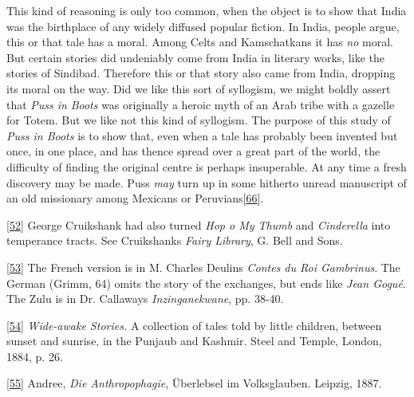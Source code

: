 \documentclass[14pt,a4paper]{memoir}
\begin{document}
This kind of reasoning is only too common, when the object is to show
that India was the birthplace of any widely diffused popular fiction. In
India, people argue, this or that tale has a moral. Among Celts and
Kamschatkans it has \emph{no} moral. But certain stories did undeniably
come from India in literary works, like the stories of Sindibad.
Therefore this or that story also came from India, dropping its moral on
the way. Did we like this sort of syllogism, we might boldly assert that
\emph{Puss in} \emph{Boots} was originally a heroic myth of an Arab
tribe with a gazelle for Totem. But we like not this kind of syllogism.
The purpose of this study of \emph{Puss in Boots} is to show that, even
when a tale has probably been invented but once, in one place, and has
thence spread over a great part of the world, the difficulty of finding
the original centre is perhaps insuperable. At any time a fresh
discovery may be made. Puss \emph{may} turn up in some hitherto unread
manuscript of an old missionary among Mexicans or
Peruvians\protect\hypertarget{4533318093929944247_33931-h-1.htm.xhtmlux5cux23FNanchor_66}{}{}\protect\hyperlink{4533318093929944247_33931-h-1.htm.xhtmlux5cux23Footnote_66}{{[}66{]}}.

\protect\hypertarget{4533318093929944247_33931-h-1.htm.xhtmlux5cux23Footnote_52}{}{}\protect\hyperlink{4533318093929944247_33931-h-0.htm.xhtmlux5cux23FNanchor_52}{{{[}52{]}}}
George Cruikshank had also turned \emph{Hop o\textquotesingle{} My
Thumb} and \emph{Cinderella} into temperance tracts. See
Cruikshank\textquotesingle s \emph{Fairy Library}, G. Bell and Sons.

\protect\hypertarget{4533318093929944247_33931-h-1.htm.xhtmlux5cux23Footnote_53}{}{}\protect\hyperlink{4533318093929944247_33931-h-0.htm.xhtmlux5cux23FNanchor_53}{{{[}53{]}}}
The French version is in M. Charles Deulin\textquotesingle s
\emph{Contes du Roi Gambrinus}. The German (Grimm, 64) omits the story
of the exchanges, but ends like \emph{Jean Gogué}. The Zulu is in Dr.
Callaway\textquotesingle s \emph{Inzinganekwane}, pp. 38-40.

\protect\hypertarget{4533318093929944247_33931-h-1.htm.xhtmlux5cux23Footnote_54}{}{}\protect\hyperlink{4533318093929944247_33931-h-0.htm.xhtmlux5cux23FNanchor_54}{{{[}54{]}}}
\emph{Wide-awake Stories.} A collection of tales told by little
children, between sunset and sunrise, in the Punjaub and Kashmir. Steel
and Temple, London, 1884, p. 26.

\protect\hypertarget{4533318093929944247_33931-h-1.htm.xhtmlux5cux23Footnote_55}{}{}\protect\hyperlink{4533318093929944247_33931-h-0.htm.xhtmlux5cux23FNanchor_55}{{{[}55{]}}}
Andree, \emph{Die Anthropophagie}, \textquotesingle Überlebsel im
Volksglauben.\textquotesingle{} Leipzig, 1887.
\end{document}

